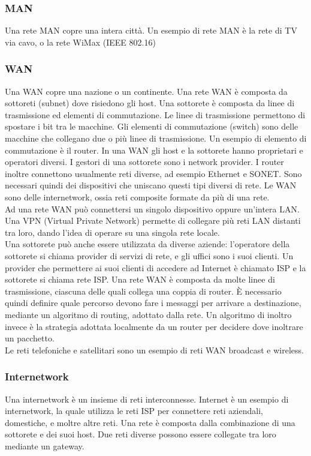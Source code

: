 \documentclass{article}
\begin{document}
			\subsubsection{MAN}
			Una rete MAN copre una intera città. Un esempio di rete MAN è la rete di TV via cavo, o la rete WiMax (IEEE 802.16)
			\subsubsection{WAN}
			Una WAN copre una nazione o un continente. Una rete WAN è composta da sottoreti (subnet) dove risiedono gli host. Una sottorete è composta da linee di trasmissione ed elementi di commutazione. Le linee di trasmissione permettono di spostare i bit tra le macchine. Gli elementi di commutazione (switch) sono delle macchine che collegano due o più linee di trasmissione. Un esempio di elemento di commutazione è il router.
			In una WAN gli host e la sottorete hanno proprietari e operatori diversi. I gestori di una sottorete sono i network provider.
			I router inoltre connettono usualmente reti diverse, ad esempio Ethernet e SONET. Sono necessari quindi dei dispositivi che uniscano questi tipi diversi di rete.
			Le WAN sono delle internetwork, ossia reti composite formate da più di una rete.\\
			Ad una rete WAN può connettersi un singolo dispositivo oppure un'intera LAN.
			Una VPN (Virtual Private Network) permette di collegare più reti LAN distanti tra loro, dando l'idea di operare su una singola rete locale.\\
			Una sottorete può anche essere utilizzata da diverse aziende: l'operatore della sottorete si chiama provider di servizi di rete, e gli uffici sono i suoi clienti. Un provider che permettere ai suoi clienti di accedere ad Internet è chiamato ISP e la sottorete si chiama rete ISP.
			Una rete WAN è composta da molte linee di trasmissione, ciascuna delle quali collega una coppia di router. È necessario quindi definire quale percorso devono fare i messaggi per arrivare a destinazione, mediante un algoritmo di routing, adottato dalla rete. Un algoritmo di inoltro invece è la strategia adottata localmente da un router per decidere dove inoltrare un pacchetto.\\
			Le reti telefoniche e satellitari sono un esempio di reti WAN broadcast e wireless.
			\subsubsection{Internetwork}
			Una internetwork è un insieme di reti interconnesse. Internet è un esempio di internetwork, la quale utilizza le reti ISP per connettere reti aziendali, domestiche, e moltre altre reti.
			Una rete è composta dalla combinazione di una sottorete e dei suoi host.
			Due reti diverse possono essere collegate tra loro mediante un gateway.
\end{document}
